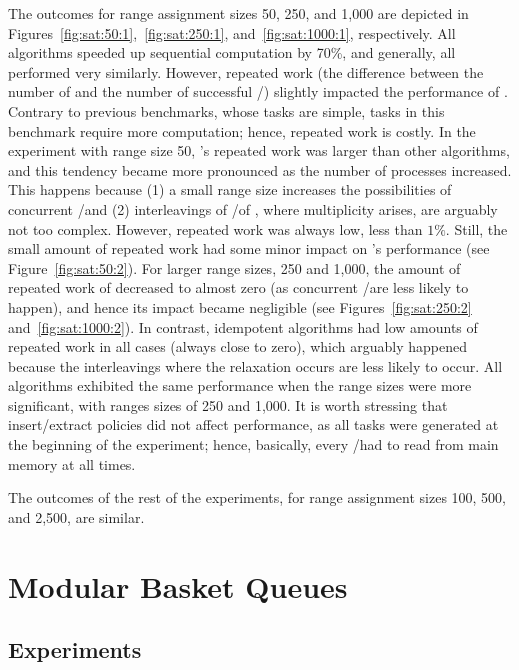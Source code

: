 The outcomes for range assignment sizes 50, 250, and 1,000 are depicted in Figures~\ref{fig:sat:50:1},~\ref{fig:sat:250:1}, and~\ref{fig:sat:1000:1}, respectively. All algorithms speeded up sequential computation by 70\%, and generally, all performed very similarly. However, repeated work (the difference between the number of \Puts and the number of successful \Takes/\Steals) slightly impacted the performance of \NCWSM. Contrary to previous benchmarks, whose tasks are simple, tasks in this benchmark require more computation; hence, repeated work is costly. In the experiment with range size 50, \NCWSM's repeated work was larger than other algorithms, and this tendency became more pronounced as the number of processes increased. This happens because (1) a small range size increases the possibilities of concurrent \Puts/\Takes and (2) interleavings of \Puts/\Takes of \NCWSM, where multiplicity arises, are arguably not too complex. However, repeated work was always low, less than $1\%$. Still, the small amount of repeated work had some minor impact on \NCWSM's performance (see Figure~\ref{fig:sat:50:2}). For larger range sizes, 250 and 1,000, the amount of repeated work of \NCWSM decreased to almost zero (as concurrent \Puts/\Takes are less likely to happen), and hence its impact became negligible (see Figures~\ref{fig:sat:250:2} and~\ref{fig:sat:1000:2}). In contrast, idempotent algorithms had low amounts of repeated work in all cases (always close to zero), which arguably happened because the interleavings where the relaxation occurs are less likely to occur. All algorithms exhibited the same performance when the range sizes were more significant, with ranges sizes of 250 and 1,000. It is worth stressing that insert/extract policies did not affect performance, as all tasks were generated at the beginning of the experiment; hence, basically, every \Take/\Steal had to read from main memory at all times.

The outcomes of the rest of the experiments, for range assignment sizes 100, 500, and 2,500, are similar.%


\section{\label{sec:results-modular-basket-queue}Modular Basket Queues}

\subsection{\label{sec:queue-experiments}Experiments}

